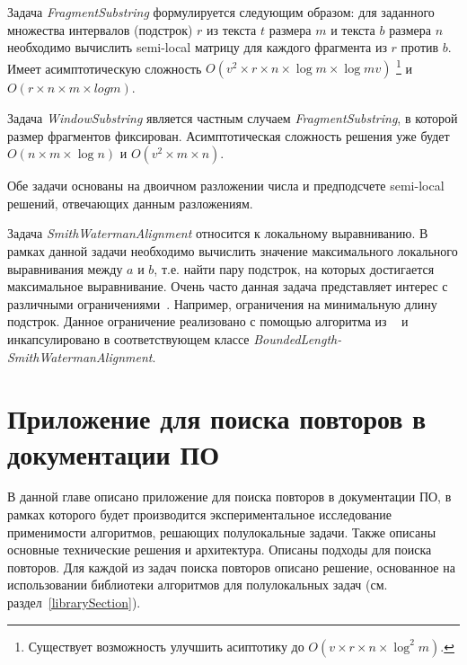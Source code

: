 Задача \emph{FragmentSubstring} формулируется следующим образом: для заданного множества интервалов (подстрок) $r$ из текста $t$ размера $m$ и текста $b$ размера $n$ необходимо вычислить {semi-local} матрицу для каждого фрагмента из $r$ против $b$.
Имеет асимптотическую сложность $O(v^2 \times r \times  n \times \log m \times \log mv)$ \footnote{Существует возможность улучшить асиптотику до $O(v \times r \times  n \times \log^{2} m)$.} и $O(r \times n \times m  \times  log m)$.

Задача \emph{WindowSubstring}  является частным случаем   \emph{FragmentSubstring}, в которой размер фрагментов фиксирован.
Асимптотическая сложность решения уже будет $O(n \times m \times \log n)$ и $O(v^2 \times  m \times n)$.

Обе задачи основаны на двоичном разложении числа и предподсчете {semi-local} решений, отвечающих данным разложениям.

Задача \emph{SmithWatermanAlignment} относится к локальному выравниванию.
В рамках данной задачи необходимо вычислить значение максимального локального выравнивания между $a$ и $b$, т.е. найти пару подстрок, на которых достигается максимальное выравнивание.
Очень часто данная задача представляет интерес с различными ограничениями~\cite{arslan2004dynamic}.
Например, ограничения на минимальную длину подстрок.
Данное ограничение реализовано с помощью алгоритма из ~\cite{tiskin2019bounded} и инкапсулировано в соответствующем классе  \emph{BoundedLength-\\SmithWatermanAlignment}.




\section{Приложение для поиска повторов в документации ПО}\label{searchPO}
В данной главе  описано приложение для поиска повторов в документации ПО, в рамках которого будет производится экспериментальное исследование применимости алгоритмов, решающих полулокальные задачи.
Также описаны  основные технические решения и архитектура.
Описаны подходы для поиска повторов.
Для каждой из задач поиска повторов описано решение, основанное на использовании библиотеки алгоритмов для полулокальных задач (см. раздел~\ref{librarySection}).

